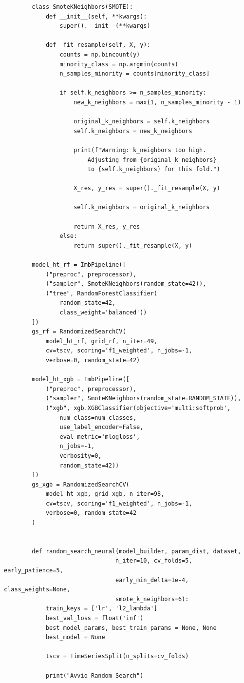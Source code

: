 \documentclass[a4paper,12pt]{report}
\begin{document}
	\begin{verbatim}
		class SmoteKNeighbors(SMOTE):
			def __init__(self, **kwargs):
				super().__init__(**kwargs)
		
			def _fit_resample(self, X, y):
				counts = np.bincount(y)
				minority_class = np.argmin(counts)
				n_samples_minority = counts[minority_class]
				
				if self.k_neighbors >= n_samples_minority:
					new_k_neighbors = max(1, n_samples_minority - 1)
					
					original_k_neighbors = self.k_neighbors
					self.k_neighbors = new_k_neighbors
					
					print(f"Warning: k_neighbors too high. 
						Adjusting from {original_k_neighbors} 
						to {self.k_neighbors} for this fold.")
					
					X_res, y_res = super()._fit_resample(X, y)
					
					self.k_neighbors = original_k_neighbors
					
					return X_res, y_res
				else:
					return super()._fit_resample(X, y)
		
		model_ht_rf = ImbPipeline([
			("preproc", preprocessor),
			("sampler", SmoteKNeighbors(random_state=42)),
			("tree", RandomForestClassifier(
				random_state=42, 
				class_weight='balanced'))
		])
		gs_rf = RandomizedSearchCV(
			model_ht_rf, grid_rf, n_iter=49, 
			cv=tscv, scoring='f1_weighted', n_jobs=-1, 
			verbose=0, random_state=42)
		
		model_ht_xgb = ImbPipeline([
			("preproc", preprocessor),
			("sampler", SmoteKNeighbors(random_state=RANDOM_STATE)),
			("xgb", xgb.XGBClassifier(objective='multi:softprob',
				num_class=num_classes,
				use_label_encoder=False,
				eval_metric='mlogloss',
				n_jobs=-1,
				verbosity=0,
				random_state=42))
		])
		gs_xgb = RandomizedSearchCV(
			model_ht_xgb, grid_xgb, n_iter=98, 
			cv=tscv, scoring='f1_weighted', n_jobs=-1, 
			verbose=0, random_state=42
		)
		
		
		def random_search_neural(model_builder, param_dist, dataset,
								n_iter=10, cv_folds=5, early_patience=5,
								early_min_delta=1e-4, class_weights=None,
								smote_k_neighbors=6):
			train_keys = ['lr', 'l2_lambda']
			best_val_loss = float('inf')
			best_model_params, best_train_params = None, None
			best_model = None
			
			tscv = TimeSeriesSplit(n_splits=cv_folds)
			
			print("Avvio Random Search")
			

\end{verbatim}
\end{document}
